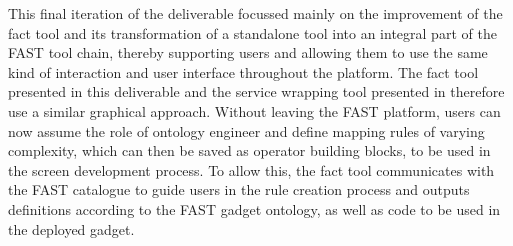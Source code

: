 This final iteration of the deliverable focussed mainly on the improvement of the fact tool and its transformation of a standalone tool into an integral part of the FAST tool chain, thereby supporting users and allowing them to use the same kind of interaction and user interface throughout the platform. The fact tool presented in this deliverable and the service wrapping tool presented in \cite{rivera2011connecting} therefore use a similar graphical approach. Without leaving the FAST platform, users can now assume the role of ontology engineer and define mapping rules of varying complexity, which can then be saved as operator building blocks, to be used in the screen development process. To allow this, the fact tool communicates with the FAST catalogue to guide users in the rule creation process and outputs definitions according to the FAST gadget ontology, as well as code to be used in the deployed gadget.

